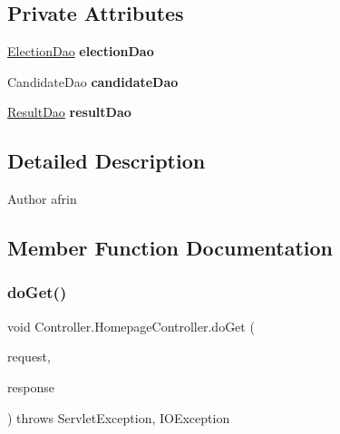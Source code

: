 \subsection*{Private Attributes}
\begin{DoxyCompactItemize}
\item 
\mbox{\label{class_controller_1_1_homepage_controller_ab6d9d6bbdbe2c8f4cc50ef6b19e7c5ac}} 
\mbox{\hyperlink{class_d_a_o_1_1_election_dao}{Election\+Dao}} {\bfseries election\+Dao}
\item 
\mbox{\label{class_controller_1_1_homepage_controller_aff84d296b5508cdb77dae264effcd504}} 
Candidate\+Dao {\bfseries candidate\+Dao}
\item 
\mbox{\label{class_controller_1_1_homepage_controller_adb5f542c5b7c5c9ec1e71d9477e2e81e}} 
\mbox{\hyperlink{class_d_a_o_1_1_result_dao}{Result\+Dao}} {\bfseries result\+Dao}
\end{DoxyCompactItemize}


\subsection{Detailed Description}
\begin{DoxyAuthor}{Author}
afrin 
\end{DoxyAuthor}


\subsection{Member Function Documentation}
\mbox{\label{class_controller_1_1_homepage_controller_acd5d3f848681669a6ac9da03d44d1db8}} 
\subsubsection{\texorpdfstring{doGet()}{doGet()}}
{\footnotesize\ttfamily void Controller.\+Homepage\+Controller.\+do\+Get (\begin{DoxyParamCaption}\item[{Http\+Servlet\+Request}]{request,  }\item[{Http\+Servlet\+Response}]{response }\end{DoxyParamCaption}) throws Servlet\+Exception, I\+O\+Exception\hspace{0.3cm}{\ttfamily [protected]}}

